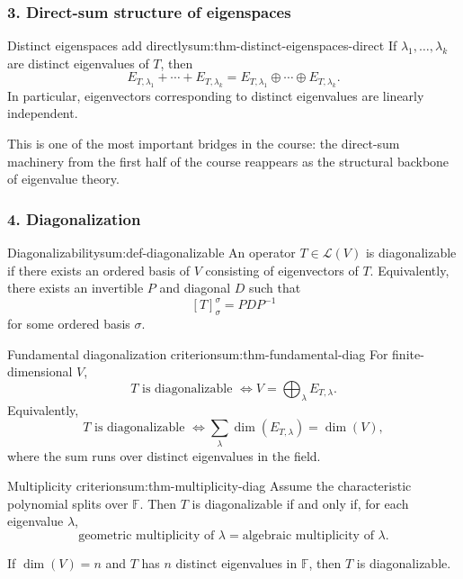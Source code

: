 \subsubsection*{3. Direct-sum structure of eigenspaces}

\begin{theorem}{Distinct eigenspaces add directly}{sum:thm-distinct-eigenspaces-direct}
If \(\lambda_1,\dots,\lambda_k\) are distinct eigenvalues of \(T\), then
\[
E_{T,\lambda_1}+\cdots+E_{T,\lambda_k}
=
E_{T,\lambda_1}\oplus\cdots\oplus E_{T,\lambda_k}.
\]
In particular, eigenvectors corresponding to distinct eigenvalues are linearly independent.
\end{theorem}

This is one of the most important bridges in the course: the direct-sum machinery from the first half of the course reappears as the structural backbone of eigenvalue theory.

\subsubsection*{4. Diagonalization}

\begin{definition}{Diagonalizability}{sum:def-diagonalizable}
An operator \(T\in \mathcal{L}(V)\) is diagonalizable if there exists an ordered basis of \(V\) consisting of eigenvectors of \(T\). Equivalently, there exists an invertible \(P\) and diagonal \(D\) such that
\[
[T]^\sigma_\sigma = PDP^{-1}
\]
for some ordered basis \(\sigma\).
\end{definition}

\begin{theorem}{Fundamental diagonalization criterion}{sum:thm-fundamental-diag}
For finite-dimensional \(V\),
\[
T \text{ is diagonalizable }
\iff
V = \bigoplus_{\lambda} E_{T,\lambda}.
\]
Equivalently,
\[
T \text{ is diagonalizable }
\iff
\sum_{\lambda}\dim(E_{T,\lambda}) = \dim(V),
\]
where the sum runs over distinct eigenvalues in the field.
\end{theorem}

\begin{theorem}{Multiplicity criterion}{sum:thm-multiplicity-diag}
Assume the characteristic polynomial splits over \(\mathbb{F}\). Then \(T\) is diagonalizable if and only if, for each eigenvalue \(\lambda\),
\[
\text{geometric multiplicity of }\lambda
=
\text{algebraic multiplicity of }\lambda.
\]
\end{theorem}

\begin{keyformula}[title={Key Formula: distinct-eigenvalue criterion}]
If \(\dim(V)=n\) and \(T\) has \(n\) distinct eigenvalues in \(\mathbb{F}\), then \(T\) is diagonalizable.
\end{keyformula}

